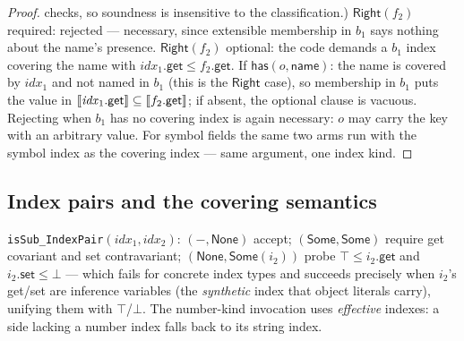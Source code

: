 \documentclass[11pt]{article}
\begin{document}
\begin{proof}
checks, so soundness is insensitive to the classification.)
$\mathsf{Right}(f_2)$ required: rejected --- necessary, since extensible
membership in $b_1$ says nothing about the name's presence.
$\mathsf{Right}(f_2)$ optional: the code demands a $b_1$ index covering
the name with $\mathit{idx}_1.\mathsf{get} \leq f_2.\mathsf{get}$. If
$\mathsf{has}(o,\mathsf{name})$: the name is covered by
$\mathit{idx}_1$ and not named in $b_1$ (this is the $\mathsf{Right}$
case), so membership in $b_1$ puts the value in
$\llbracket \mathit{idx}_1.\mathsf{get} \rrbracket \subseteq \llbracket f_2.\mathsf{get} \rrbracket$;
if absent, the optional clause is vacuous. Rejecting when $b_1$ has no
covering index is again necessary: $o$ may carry the key with an
arbitrary value. For symbol fields the same two arms run with the symbol
index as the covering index --- same argument, one index kind.
\end{proof}

\subsection{Index pairs and the covering semantics}
\label{sec:indexes}

\begin{definition}
\texttt{isSub\_IndexPair}$(\mathit{idx}_1, \mathit{idx}_2)$:
$(-, \mathsf{None})$ accept; $(\mathsf{Some}, \mathsf{Some})$ require
get covariant and set contravariant;
$(\mathsf{None}, \mathsf{Some}(i_2))$ probe
$\top \leq i_2.\mathsf{get}$ and $i_2.\mathsf{set} \leq \bot$ --- which
fails for concrete index types and succeeds precisely when $i_2$'s
get/set are inference variables (the \emph{synthetic} index that object
literals carry), unifying them with $\top$/$\bot$.
The number-kind invocation uses \emph{effective} indexes: a side lacking
a number index falls back to its string index.
\end{definition}
\end{document}
